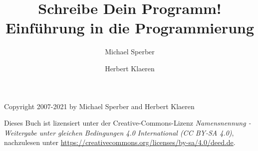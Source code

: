\documentclass{tup}
\theoremstyle{plain}
\theoremstyle{plain}
\theoremstyle{break}
\begin{document}
\setcounter{tocdepth}{1}
\begin{titlepage}
\title{Schreibe Dein Programm!\\{\large Einführung in die Programmierung}}
\author{Michael Sperber \and Herbert Klaeren}
\maketitle
Copyright \textcopyright{} 2007-2021 by Michael
  Sperber and Herbert Klaeren
  
  Dieses Buch ist lizensiert unter der Creative-Commons-Lizenz
  \textit{Namensnennung - Weitergabe unter gleichen Bedingungen 4.0 International (CC BY-SA 4.0)}, nachzulesen
  unter \url{https://creativecommons.org/licenses/by-sa/4.0/deed.de}.
\end{titlepage}

\thispagestyle{empty}

\tableofcontents

\setcounter{page}{1}
































% 

% 

% 

% 







\renewcommand{\sc}{\bfseries\scshape}



\printindex[variables]
\printindex
\end{document}
